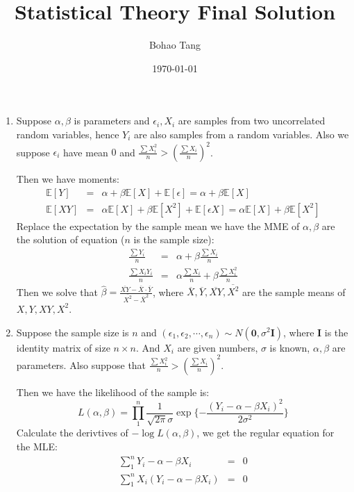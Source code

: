 \documentclass[12pt]{article}
\title{Statistical Theory Final Solution}
\date{\today}
\author{Bohao Tang}
\newcommand{\ep}[1]{\mathbb{E}\left[ #1 \right]}
\begin{document}

\maketitle

\begin{enumerate}
    \item
    Suppose $\alpha, \beta$ is parameters and $\epsilon_i, X_i$ are samples from two uncorrelated random variables, hence $Y_i$ are also samples from a random variables.
    Also we suppose $\epsilon_i$ have mean $0$ and $\frac{\sum{X^2_i}}{n} > (\frac{\sum{X_i}}{n})^2$.
    
    Then we have moments:
    \begin{eqnarray}
        \ep{Y} &=& \alpha + \beta \ep{X} + \ep{\epsilon} = \alpha + \beta \ep{X}\\
        \ep{X Y} &=& \alpha \ep{X} + \beta \ep{X^2} + \ep{\epsilon X} = \alpha \ep{X} + \beta \ep{X^2}
    \end{eqnarray} 
    Replace the expectation by the sample mean we have the MME of $\alpha, \beta$ are the solution of equation ($n$ is the sample size):
    \begin{eqnarray}
        \frac{\sum{Y_i}}{n} &=& \alpha + \beta \frac{\sum{X_i}}{n} \\
        \frac{\sum{X_i Y_i}}{n} &=& \alpha \frac{\sum{X_i}}{n} + \beta \frac{\sum{X_i^2}}{n} 
    \end{eqnarray}
    Then we solve that $\hat{\beta} = \frac{\overline{XY} - \overline{X} \cdot \overline{Y}}{\overline{X^2} - \overline{X}^2}$, where $\overline{X}, \overline{Y}, \overline{XY}, \overline{X^2}$ are the sample means of $X, Y, XY, X^2$.

    \item
    Suppose the sample size is $n$ and $(\epsilon_1, \epsilon_2, \cdots, \epsilon_n) \sim N(\bm{0}, \sigma^2 \textbf{I})$, where $\textbf{I}$ is the identity matrix of size $n \times n$. And $X_i$ are given numbers, $\sigma$ is known, $\alpha, \beta$ are parameters.
    Also suppose that $\frac{\sum{X^2_i}}{n} > (\frac{\sum{X_i}}{n})^2$.

    Then we have the likelihood of the sample is:
    $$L(\alpha, \beta) = \prod_1^n \frac{1}{\sqrt{2\pi}\sigma} \exp\{-\frac{(Y_i - \alpha - \beta X_i)^2}{2\sigma^2}\}$$
    Calculate the derivtives of $-\log{L(\alpha, \beta)}$, we get the regular equation for the MLE:
    \begin{eqnarray}
       \sum_1^n Y_i - \alpha - \beta X_i &=& 0 \\
       \sum_1^n X_i (Y_i - \alpha - \beta X_i) &=& 0
    \end{eqnarray}


\end{enumerate}
\end{document}
